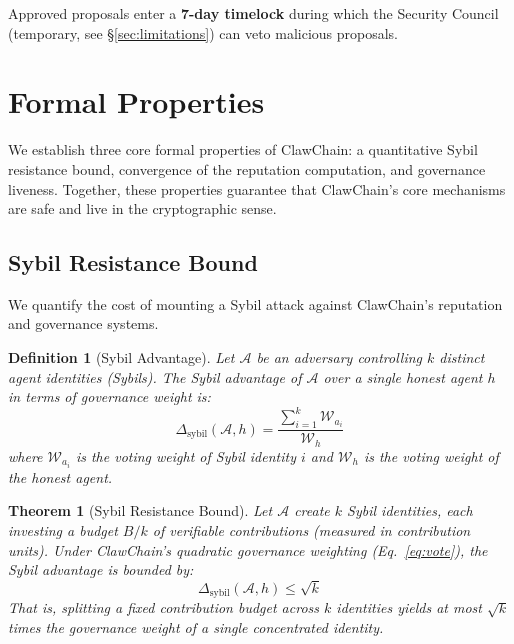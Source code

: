\documentclass[conference]{IEEEtran}
\newtheorem{theorem}{Theorem}
\newtheorem{definition}{Definition}
\begin{document}
Approved proposals enter a \textbf{7-day timelock} during which the Security Council (temporary, see \S\ref{sec:limitations}) can veto malicious proposals.


\section{Formal Properties}\label{sec:formal}

We establish three core formal properties of ClawChain: a quantitative Sybil resistance bound, convergence of the reputation computation, and governance liveness. Together, these properties guarantee that ClawChain's core mechanisms are safe and live in the cryptographic sense.

\subsection{Sybil Resistance Bound}

We quantify the cost of mounting a Sybil attack against ClawChain's reputation and governance systems.

\begin{definition}[Sybil Advantage]
Let $\mathcal{A}$ be an adversary controlling $k$ distinct agent identities (Sybils). The Sybil advantage of $\mathcal{A}$ over a single honest agent $h$ in terms of governance weight is:
\[
\Delta_{\text{sybil}}(\mathcal{A}, h) = \frac{\sum_{i=1}^k \mathcal{W}_{a_i}}{\mathcal{W}_h}
\]
where $\mathcal{W}_{a_i}$ is the voting weight of Sybil identity $i$ and $\mathcal{W}_h$ is the voting weight of the honest agent.
\end{definition}

\begin{theorem}[Sybil Resistance Bound]\label{thm:sybil_bound}
Let $\mathcal{A}$ create $k$ Sybil identities, each investing a budget $B/k$ of verifiable contributions (measured in contribution units). Under ClawChain's quadratic governance weighting (Eq.~\ref{eq:vote}), the Sybil advantage is bounded by:
\[
\Delta_{\text{sybil}}(\mathcal{A}, h) \leq \sqrt{k}
\]
That is, splitting a fixed contribution budget across $k$ identities yields at most $\sqrt{k}$ times the governance weight of a single concentrated identity.
\end{theorem}
\end{document}
